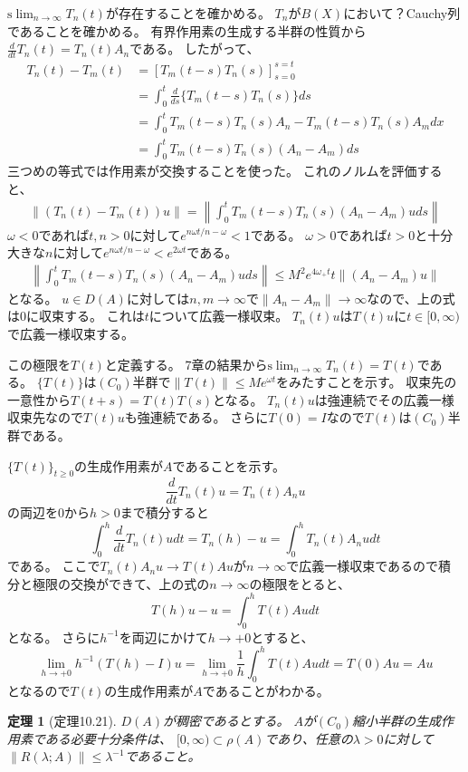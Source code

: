 \documentclass{jsarticle}
\newtheorem{thm}{定理}
\newcommand{\norm}[1]{\|#1\|}
\newcommand{\slim}{\mathrm{s}\lim}
\begin{document}
$\slim_{n\to\infty}T_n(t)$が存在することを確かめる。
$T_n$が$B(X)$において？Cauchy列であることを確かめる。
有界作用素の生成する半群の性質から$\frac{d}{dt}T_n(t)=T_n(t)A_n$である。
したがって、
\begin{align*}
T_n(t)-T_m(t)&=[T_m(t-s)T_n(s)]^{s=t}_{s=0}\\
&=\int^t_0\frac{d}{ds}\{T_m(t-s)T_n(s)\}ds\\
&=\int^t_0T_m(t-s)T_n(s)A_n-T_m(t-s)T_n(s)A_mdx\\
&=\int^t_0T_m(t-s)T_n(s)(A_n-A_m)ds
\end{align*}
三つめの等式では作用素が交換することを使った。
これのノルムを評価すると、
\begin{align*}
\norm{(T_n(t)-T_m(t))u}=\left\|\int^t_0T_m(t-s)T_n(s)(A_n-A_m)uds\right\|
\end{align*}
$\omega<0$であれば$t,n>0$に対して$e^{n\omega t/n-\omega}<1$である。
$\omega>0$であれば$t>0$と十分大きな$n$に対して$e^{n\omega t/n-\omega}<e^{2\omega t}$である。
\begin{align*}
\left\|\int^t_0T_m(t-s)T_n(s)(A_n-A_m)uds\right\|\leq M^2e^{4\omega_+t}t\norm{(A_n-A_m)u}
\end{align*}
となる。
$u\in D(A)$に対しては$n,m\to\infty$で$\norm{A_n-A_m}\to\infty$なので、上の式は$0$に収束する。
これは$t$について広義一様収束。
$T_n(t)u$は$T(t)u$に$t\in[0,\infty)$で広義一様収束する。

この極限を$T(t)$と定義する。
7章の結果から$\slim_{n\to\infty}T_n(t)=T(t)$である。
$\{T(t)\}$は$(C_0)$半群で$\norm{T(t)}\leq Me^{\omega t}$をみたすことを示す。
収束先の一意性から$T(t+s)=T(t)T(s)$となる。
$T_n(t)u$は強連続でその広義一様収束先なので$T(t)u$も強連続である。
さらに$T(0)=I$なので$T(t)$は$(C_0)$半群である。

$\{T(t)\}_{t\geq0}$の生成作用素が$A$であることを示す。
\[
\frac{d}{dt}T_n(t)u=T_n(t)A_nu
\]
の両辺を$0$から$h>0$まで積分すると
\[
\int^h_0\frac{d}{dt}T_n(t)udt=T_n(h)-u=\int^h_0T_n(t)A_nudt
\]
である。
ここで$T_n(t)A_nu\to T(t)Au$が$n\to\infty$で広義一様収束であるので積分と極限の交換ができて、上の式の$n\to\infty$の極限をとると、
\[
T(h)u-u=\int^h_0T(t)Audt
\]
となる。
さらに$h^{-1}$を両辺にかけて$h\to+0$とすると、
\[
\lim_{h\to+0}h^{-1}(T(h)-I)u=\lim_{h\to+0}\frac{1}{h}\int^h_0T(t)Audt=T(0)Au=Au
\]
となるので$T(t)$の生成作用素が$A$であることがわかる。

\begin{thm}[定理10.21]
$D(A)$が稠密であるとする。
$A$が$(C_0)$縮小半群の生成作用素である必要十分条件は、
$[0,\infty)\subset\rho(A)$であり、任意の$\lambda>0$に対して$\norm{R(\lambda;A)}\leq\lambda^{-1}$であること。
\end{thm}
\end{document}
